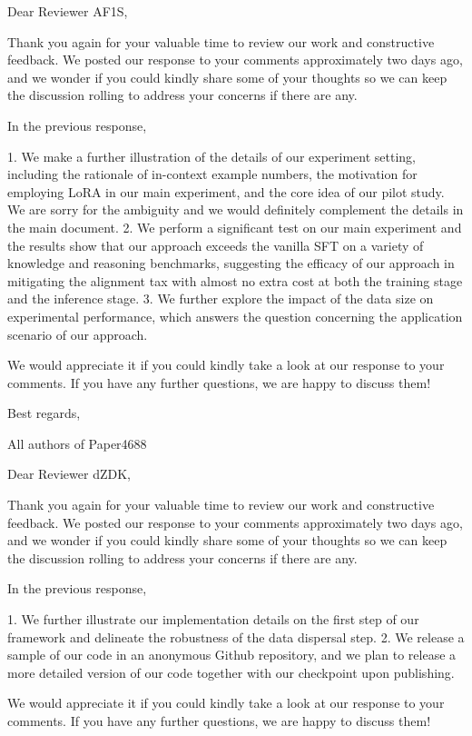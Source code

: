 Dear Reviewer AF1S,

Thank you again for your valuable time to review our work and constructive feedback. We posted our response to your comments approximately two days ago, and we wonder if you could kindly share some of your thoughts so we can keep the discussion rolling to address your concerns if there are any.

In the previous response,

1. We make a further illustration of the details of our experiment setting, including the rationale of in-context example numbers, the motivation for employing LoRA in our main experiment, and the core idea of our pilot study. We are sorry for the ambiguity and we would definitely complement the details in the main document.     
2. We perform a significant test on our main experiment and the results show that our approach exceeds the vanilla SFT on a variety of knowledge and reasoning benchmarks, suggesting the efficacy of our approach in mitigating the alignment tax with almost no extra cost at both the training stage and the inference stage.
3. We further explore the impact of the data size on experimental performance, which answers the question concerning the application scenario of our approach. 

We would appreciate it if you could kindly take a look at our response to your comments. If you have any further questions, we are happy to discuss them!

Best regards,

All authors of Paper4688




Dear Reviewer dZDK,

Thank you again for your valuable time to review our work and constructive feedback. We posted our response to your comments approximately two days ago, and we wonder if you could kindly share some of your thoughts so we can keep the discussion rolling to address your concerns if there are any.

In the previous response,

1. We further illustrate our implementation details on the first step of our framework and delineate the robustness of the data dispersal step.     
2. We release a sample of our code in an anonymous Github repository, and we plan to release a more detailed version of our code together with our checkpoint upon publishing.


We would appreciate it if you could kindly take a look at our response to your comments. If you have any further questions, we are happy to discuss them!


